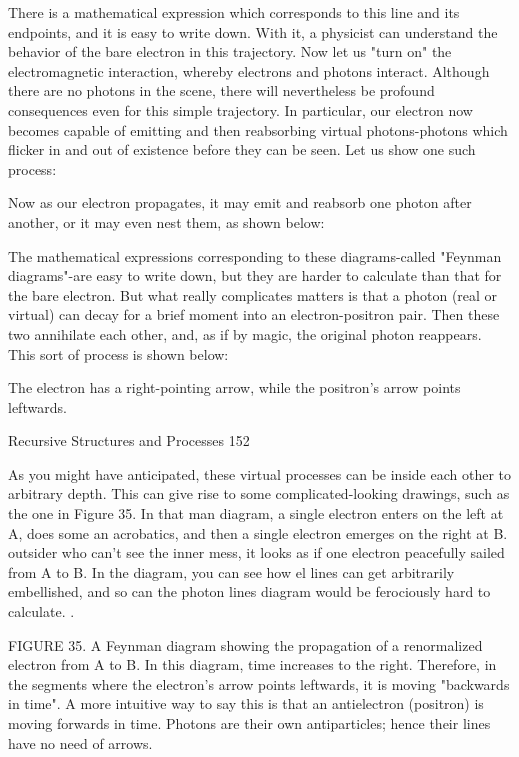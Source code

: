 There is a mathematical expression which corresponds to this line and its endpoints, and
it is easy to write down. With it, a physicist can understand the behavior of the bare
electron in this trajectory.
        Now let us "turn on" the electromagnetic interaction, whereby electrons and
photons interact. Although there are no photons in the scene, there will nevertheless be
profound consequences even for this simple trajectory. In particular, our electron now
becomes capable of emitting and then reabsorbing virtual photons-photons which flicker
in and out of existence before they can be seen. Let us show one such process:




Now as our electron propagates, it may emit and reabsorb one photon after another, or it
may even nest them, as shown below:




The mathematical expressions corresponding to these diagrams-called "Feynman
diagrams"-are easy to write down, but they are harder to calculate than that for the bare
electron. But what really complicates matters is that a photon (real or virtual) can decay
for a brief moment into an electron-positron pair. Then these two annihilate each other,
and, as if by magic, the original photon reappears. This sort of process is shown below:




The electron has a right-pointing arrow, while the positron's arrow points leftwards.




Recursive Structures and Processes                                                        152

        As you might have anticipated, these virtual processes can be inside each other to
arbitrary depth. This can give rise to some complicated-looking drawings, such as the one
in Figure 35. In that man diagram, a single electron enters on the left at A, does some an
acrobatics, and then a single electron emerges on the right at B. outsider who can't see the
inner mess, it looks as if one electron peacefully sailed from A to B. In the diagram, you
can see how el lines can get arbitrarily embellished, and so can the photon lines diagram
would be ferociously hard to calculate.
        .




FIGURE 35. A Feynman diagram showing the propagation of a renormalized electron
from A to B. In this diagram, time increases to the right. Therefore, in the segments
where the electron’s arrow points leftwards, it is moving "backwards in time". A more
intuitive way to say this is that an antielectron (positron) is moving forwards in time.
Photons are their own antiparticles; hence their lines have no need of arrows.

